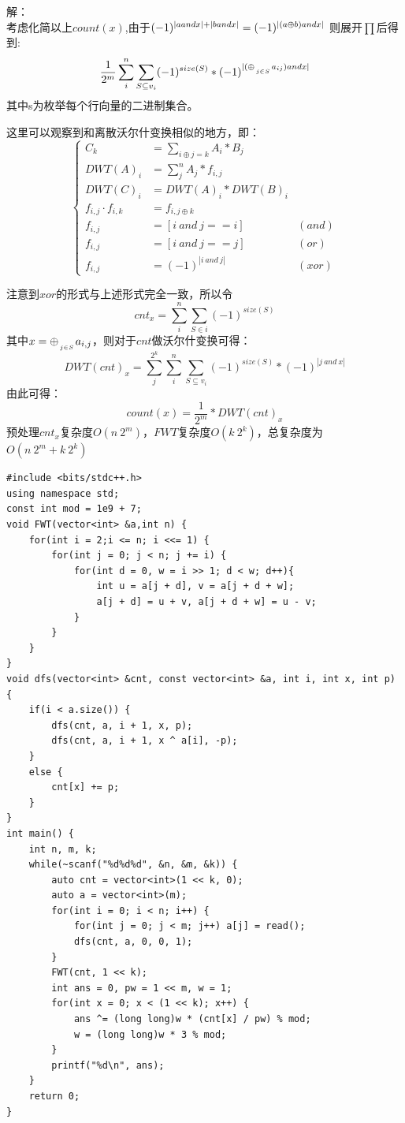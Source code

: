 \documentclass[10pt]{ctexart}
\begin{document}
{解：\\
考虑化简以上$count(x)$,由于$(-1)^{|a\space and \space x| + |b\space and\space x|}= (-1)^{|(a \space \oplus \space b) \space and \space x|}$
则展开$\prod$后得到:
$$
\frac{1}{2^m} \sum_i^n \sum_{S \subseteq {v_i}} (-1)^{size(S)} * (-1)^{|(\oplus_{\atop j \in S}a_{ij}) \space and \space x |}
$$
其中s为枚举每个行向量的二进制集合。
  
这里可以观察到和离散沃尔什变换相似的地方，即：\\

\begin{equation*}
\left\{
    \begin{aligned}
        C_k&=\sum_{i\oplus j=k}A_i*B_j \\
        DWT(A)_i&=\sum_j^nA_j*f_{i,j} \\
        DWT(C)_i&=DWT(A)_i*DWT(B)_i\\
        f_{i,j} \cdot f_{i,k} &=f_{i,j\oplus k}\\
        f_{i,j} &= [i \ and \ j == i] \  &(and)\\
        f_{i,j} &= [i \  and \  j == j] \ &(or)\\
        f_{i,j} &= (-1)^{| i \  and \  j |} \ &(xor)
    \end{aligned}
\right.
\end{equation*}

注意到$xor$的形式与上述形式完全一致，所以令
$$cnt_x = \sum_i^n \sum_{S \in i} (-1)^{size(S)}$$
其中$x=\oplus_{\atop j \in S} a_{i,j}$，则对于$cnt$做沃尔什变换可得：
$$
DWT(cnt)_x=\sum_j^{2^k}\sum_i^n\sum_{S \subseteq v_i} (-1)^{size(S)}*(-1)^{|j \ and \ x|}
$$
由此可得：
$$count(x)=\frac{1}{2^m} *DWT(cnt)_x$$
预处理$cnt_x$复杂度$O(n\  2^m)$，$FWT$复杂度$O(k\ 2^k)$，总复杂度为$O(n \ 2^m + k \ 2^k)$

\begin{lstlisting}
#include <bits/stdc++.h>
using namespace std;
const int mod = 1e9 + 7;
void FWT(vector<int> &a,int n) {
    for(int i = 2;i <= n; i <<= 1) {
        for(int j = 0; j < n; j += i) {
            for(int d = 0, w = i >> 1; d < w; d++){
                int u = a[j + d], v = a[j + d + w];
                a[j + d] = u + v, a[j + d + w] = u - v;
            }
        }
    }
}
void dfs(vector<int> &cnt, const vector<int> &a, int i, int x, int p) {
    if(i < a.size()) {
        dfs(cnt, a, i + 1, x, p);
        dfs(cnt, a, i + 1, x ^ a[i], -p);
    }
    else {
        cnt[x] += p;
    }
}
int main() {
    int n, m, k;
    while(~scanf("%d%d%d", &n, &m, &k)) {
        auto cnt = vector<int>(1 << k, 0);
        auto a = vector<int>(m);
        for(int i = 0; i < n; i++) {
            for(int j = 0; j < m; j++) a[j] = read();
            dfs(cnt, a, 0, 0, 1);
        }
        FWT(cnt, 1 << k);
        int ans = 0, pw = 1 << m, w = 1;
        for(int x = 0; x < (1 << k); x++) {
            ans ^= (long long)w * (cnt[x] / pw) % mod;
            w = (long long)w * 3 % mod;
        }
        printf("%d\n", ans);
    }
    return 0;
} 
\end{lstlisting}
}
\end{document}
